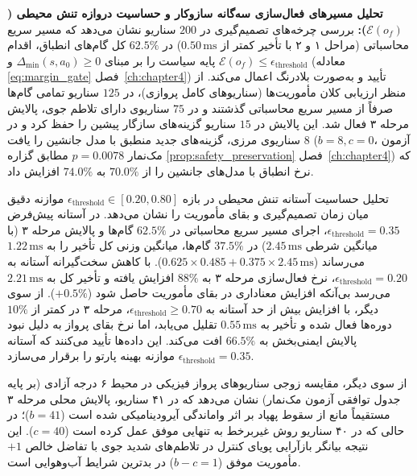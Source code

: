 \documentclass[oneside,openany,phd]{TMU-Thesis}
\begin{document}
\noindent\textbf{تحلیل مسیرهای فعال‌سازی سه‌گانه سازوکار \pgalr و حساسیت دروازه تنش محیطی (\texorpdfstring{$\mathcal{E}(o_f)$}{E(of)}):}
بررسی چرخه‌های تصمیم‌گیری در $200$ سناریو نشان می‌دهد که مسیر سریع محاسباتی (مراحل ۱ و ۲ با تأخیر کمتر از $0.50\,\text{ms}$) در $62.5\%$ کل گام‌های انطباق، اقدام پایه سیاست را بر مبنای $\Delta_{\min}(s, a_0) \ge 0$ و $\mathcal{E}(o_f) \le \epsilon_{\text{threshold}}$ (معادله \ref{eq:margin_gate} فصل~\ref{ch:chapter4}) تأیید و به‌صورت بلادرنگ اعمال می‌کند. از منظر ارزیابی کلان مأموریت‌ها (سناریوهای کامل پروازی)، در $125$ سناریو تمامی گام‌ها صرفاً از مسیر سریع محاسباتی گذشتند و در $75$ سناریوی دارای تلاطم جوی، پالایش مرحله ۳ فعال شد. این پالایش در $15$ سناریو گزینه‌های سازگار پیشین را حفظ کرد و در $8$ سناریوی مرزی، گزینه‌های جدید منطبق با مدل جانشین را یافت ($b=8, c=0$، آزمون مک‌نمار $p = 0.0078$ مطابق گزاره \ref{prop:safety_preservation} فصل~\ref{ch:chapter4}) که نرخ انطباق با مدل‌های جانشین را از $70.0\%$ به $74.0\%$ افزایش داد.

تحلیل حساسیت آستانه تنش محیطی در بازه $\epsilon_{\text{threshold}} \in [0.20, 0.80]$ موازنه دقیق میان زمان تصمیم‌گیری و بقای مأموریت را نشان می‌دهد. در آستانه پیش‌فرض $\epsilon_{\text{threshold}} = 0.35$، اجرای مسیر سریع محاسباتی در $62.5\%$ گام‌ها و پالایش مرحله ۳ (با میانگین شرطی $2.45\,\text{ms}$) در $37.5\%$ گام‌ها، میانگین وزنی کل تأخیر را به $1.22\,\text{ms}$ می‌رساند ($0.625 \times 0.485 + 0.375 \times 2.45\,\text{ms}$). با کاهش سخت‌گیرانه آستانه به $\epsilon_{\text{threshold}} = 0.20$، نرخ فعال‌سازی مرحله ۳ به $88\%$ افزایش یافته و تأخیر کل به $2.21\,\text{ms}$ می‌رسد بی‌آنکه افزایش معناداری در بقای مأموریت حاصل شود ($+0.5\%$). از سوی دیگر، با افزایش بیش از حد آستانه به $\epsilon_{\text{threshold}} \ge 0.70$، مرحله ۳ در کمتر از $10\%$ دوره‌ها فعال شده و تأخیر به $0.55\,\text{ms}$ تقلیل می‌یابد، اما نرخ بقای پرواز به دلیل نبود پالایش ایمنی‌بخش به $66.5\%$ افت می‌کند. این داده‌ها تأیید می‌کنند که آستانه $\epsilon_{\text{threshold}} = 0.35$ موازنه بهینه پارتو را برقرار می‌سازد.

از سوی دیگر، مقایسه زوجی سناریوهای پرواز فیزیکی در محیط ۶ درجه آزادی (بر پایه جدول توافقی آزمون مک‌نمار) نشان می‌دهد که در ۴۱ سناریو، پالایش محلی مرحله ۳ مستقیماً مانع از سقوط پهپاد بر اثر واماندگی آیرودینامیکی شده است ($b=41$)؛ در حالی که در ۴۰ سناریو روش غیربرخط \mursdrl به تنهایی موفق عمل کرده است ($c=40$). این نتیجه بیانگر بازآرایی پویای کنترل در تلاطم‌های شدید جوی با تفاضل خالص $+1$ مأموریت موفق ($b - c = 1$) در بدترین شرایط آب‌وهوایی است.

\end{document}
